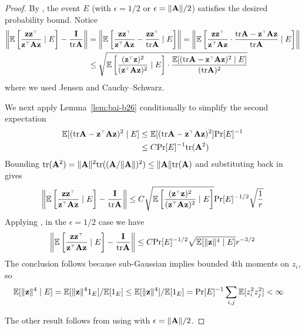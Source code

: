 \documentclass[11pt]{article}
\begin{document}
\begin{proof}
  By , the event $E$
  (with $\epsilon = 1/2$ or $\epsilon = \|\mathbf A\| / 2$) satisfies the desired
  probability bound. Notice
  \begin{align*}
    \left\| \E \left[ 
      \frac{\z \z^\top}{\z^\top \A \z}
    \mid E \right] - \frac{\I}{\tr \A} \right\| 
    &= \left\| \E \left[ 
      \frac{\z \z^\top}{\z^\top \A \z} - \frac{\z \z^\top}{\tr \A} 
    \mid E \right] \right\| 
    = \left\| \E \left[ 
      \frac{\z \z^\top}{\z^\top \A \z} \cdot \frac{ \tr \A - \z^\top \A \z }{\tr \A} 
    \mid E \right] \right\| \\ 
    &\le \sqrt{\E \left[
      \frac{ (\z^\top \z)^2 }{ (\z^\top \A \z)^2 } 
  \mid E \right] \cdot \frac{ \E[(\tr \A - \z^\top \A \z)^2 \mid E]}{(\tr \A)^2} } \\
  \end{align*}
  where we used Jensen and Cauchy–Schwarz.

  We next apply Lemma~\ref{lem:bai-b26} conditionally
  to simplify the second expectation
  \begin{align*}
    \E[(\tr \A - \z^\top \A \z)^2  \mid E]
    &\leq \E[(\tr \A - \z^\top \A \z)^2] \Pr[E]^{-1} \\
    &\leq C \Pr[E]^{-1} \tr(\A^2)
  \end{align*}
  Bounding $\mathrm{tr}(\mathbf A^2) = \|\mathbf A\|^2 \mathrm{tr}((\mathbf A / \|\mathbf A\|)^2) \leq \|\mathbf A\| \mathrm{tr}(\mathbf A)$
  and substituting back in gives
  \[
    \left\| \E \left[ 
      \frac{\z \z^\top}{\z^\top \A \z}
    \mid E \right] - \frac{\I}{\tr \A} \right\| 
    \le C \sqrt{\E \left[
      \frac{ (\z^\top \z)^2 }{ (\z^\top \A \z)^2 } 
    \mid E \right]} \Pr[E]^{-1/2} \sqrt{\frac{1}{r}}
  \]
  Applying , in the $\epsilon = 1/2$ case
  we have
  \[
    \left\| \E \left[ 
      \frac{\z \z^\top}{\z^\top \A \z} \mid E
    \right] - \frac{\I}{\tr \A} \right\| 
    \le C \Pr[E]^{-1/2} \sqrt{\E[\|\z\|^4 \mid E]} r^{-3/2}
  \]
  The conclusion follows because sub-Gaussian implies bounded $4$th moments on
  $z_i$, so
  \begin{align*}
    \mathbb E[\|\mathbf z\|^4 \mid E]
    &= \mathbb E[\|\mathbf z\|^4 1_{E}] / \mathbb E[1_E]
    \leq \mathbb E[\|\mathbf z\|^4] / \mathbb E[1_E]
    = \mathrm{Pr}[E]^{-1} \sum_{i,j} \mathbb E[z_i^2 z_j^2]
    < \infty 
  \end{align*}

  The other result follows from using
   with $\epsilon = \|\mathbf A\| / 2$.
\end{proof}



  
\end{document}
